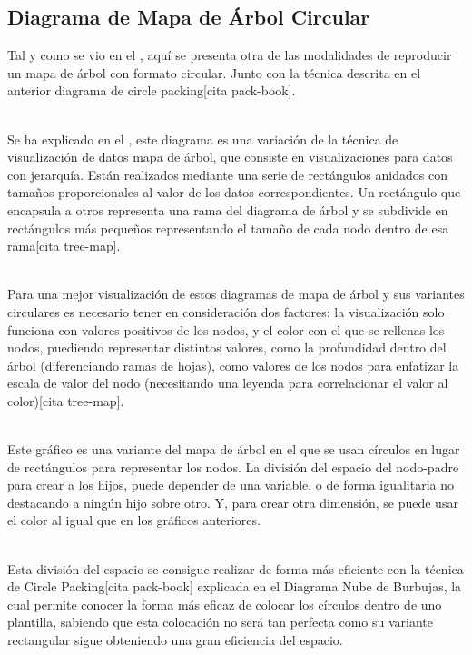 \documentclass{article}\usepackage[]{graphicx}\usepackage[]{color}
\begin{document}
\subsection{Diagrama de Mapa de \'Arbol Circular}
Tal y como se vio en el , aqu\'i se presenta otra de las modalidades de reproducir un mapa de \'arbol con formato circular. Junto con la t\'ecnica descrita en el anterior diagrama de circle packing[cita pack-book].~\\~\par
Se ha explicado en el , este diagrama es una variaci\'on de la t\'ecnica de visualizaci\'on de datos mapa de \'arbol, que consiste en visualizaciones para datos con jerarqu\'ia. Est\'an realizados mediante una serie de rect\'angulos anidados con tama\~nos proporcionales al valor de los datos correspondientes. Un rect\'angulo que encapsula a otros representa una rama del diagrama de \'arbol y se subdivide en rect\'angulos m\'as peque\~nos representando el tama\~no de cada nodo dentro de esa rama[cita tree-map].~\\~\par
Para una mejor visualizaci\'on de estos diagramas de mapa de \'arbol y sus variantes circulares es necesario tener en consideraci\'on dos factores: la visualizaci\'on solo funciona con valores positivos de los nodos, y el color con el que se rellenas los nodos, puediendo representar distintos valores, como la profundidad dentro del \'arbol (diferenciando ramas de hojas), como valores de los nodos para enfatizar la escala de valor del nodo (necesitando una leyenda para correlacionar el valor al color)[cita tree-map].~\\~\par
Este gr\'afico es una variante del mapa de \'arbol en el que se usan c\'irculos en lugar de rect\'angulos para representar los nodos. La divisi\'on del espacio del nodo-padre para crear a los hijos, puede depender de una variable, o de forma igualitaria no destacando a ning\'un hijo sobre otro. Y, para crear otra dimensi\'on, se puede usar el color al igual que en los gr\'aficos anteriores.~\\~\par
Esta divisi\'on del espacio se consigue realizar de forma m\'as eficiente con la t\'ecnica de Circle Packing[cita pack-book] explicada en el Diagrama Nube de Burbujas, la cual permite conocer la forma m\'as eficaz de colocar los c\'irculos dentro de uno plantilla, sabiendo que esta colocaci\'on no ser\'a tan perfecta como su variante rectangular sigue obteniendo una gran eficiencia del espacio.~\\~\par
\end{document}
